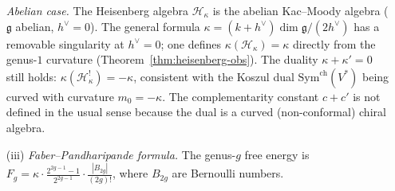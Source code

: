 \begin{theorem}
\begin{enumerate}
\emph{Abelian case.}
The Heisenberg algebra $\mathcal{H}_\kappa$ is the abelian Kac--Moody algebra
($\mathfrak{g}$ abelian, $h^\vee = 0$).  The general formula
$\kappa = (k + h^\vee)\dim\mathfrak{g}/(2h^\vee)$ has a removable singularity
at $h^\vee = 0$; one defines $\kappa(\mathcal{H}_\kappa) = \kappa$ directly
from the genus-$1$ curvature (Theorem~\ref{thm:heisenberg-obs}).
The duality $\kappa + \kappa' = 0$ still holds: $\kappa(\mathcal{H}_\kappa^!) = -\kappa$,
consistent with the Koszul dual $\mathrm{Sym}^{\mathrm{ch}}(V^*)$ being curved with
curvature $m_0 = -\kappa$.  The complementarity constant $c + c'$ is not defined
in the usual sense because the dual is a curved (non-conformal) chiral algebra.
\item[\textup{(iii)}] \emph{Faber--Pandharipande formula.}
The genus-$g$ free energy is
$F_g = \kappa \cdot \frac{2^{2g-1}-1}{2^{2g-1}} \cdot \frac{|B_{2g}|}{(2g)!}$,
where $B_{2g}$ are Bernoulli numbers.
\end{enumerate}
\end{theorem}

